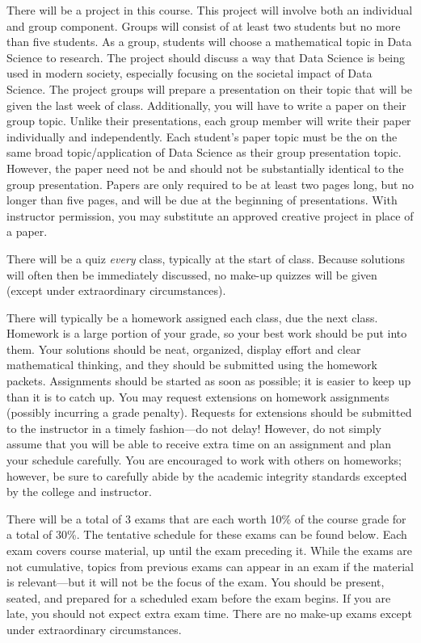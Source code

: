 \documentclass[11pt,letterpaper]{article}
\begin{document}
There will be a project in this course. This project will involve both an individual and group component. Groups will consist of at least two students but no more than five students. As a group, students will choose a mathematical topic in Data Science to research. The project should discuss a way that Data Science is being used in modern society, especially focusing on the societal impact of Data Science. The project groups will prepare a presentation on their topic that will be given the last week of class. Additionally, you will have to write a paper on their group topic. Unlike their presentations, each group member will write their paper individually and independently. Each student's paper topic must be the on the same broad topic/application of Data Science as their group presentation topic. However, the paper need not be and should not be substantially identical to the group presentation. Papers are only required to be at least two pages long, but no longer than five pages, and will be due at the beginning of presentations. With instructor permission, you may substitute an approved creative project in place of a paper. \pspace



There will be a quiz \textit{every} class, typically at the start of class. Because solutions will often then be immediately discussed, no make-up quizzes will be given (except under extraordinary circumstances). \pspace


There will typically be a homework assigned each class, due the next class. Homework is a large portion of your grade, so your best work should be put into them. Your solutions should be neat, organized, display effort and clear mathematical thinking, and they should be submitted using the homework packets. Assignments should be started as soon as possible; it is easier to keep up than it is to catch up. You may request extensions on homework assignments (possibly incurring a grade penalty). Requests for extensions should be submitted to the instructor in a timely fashion---do not delay! However, do not simply assume that you will be able to receive extra time on an assignment and plan your schedule carefully. You are encouraged to work with others on homeworks; however, be sure to carefully abide by the academic integrity standards excepted by the college and instructor. \pspace


There will be a total of 3 exams that are each worth 10\% of the course grade for a total of 30\%. The tentative schedule for these exams can be found below. Each exam covers course material, up until the exam preceding it. While the exams are not cumulative, topics from previous exams can appear in an exam if the material is relevant---but it will not be the focus of the exam. You should be present, seated, and prepared for a scheduled exam before the exam begins. If you are late, you should not expect extra exam time. There are no make-up exams except under extraordinary circumstances. \pspace
\end{document}
